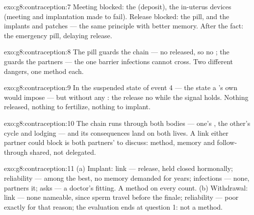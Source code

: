 \begin{solution}{exo:g8:contraception:7}
Meeting blocked: the  (deposit), the in-uterus
devices (meeting and implantation made to fail). Release
blocked: the pill, and the implants and patches --- the
same principle with better memory. After the fact: the
emergency pill, delaying release.
\end{solution}

\begin{solution}{exo:g8:contraception:8}
The pill guards the chain --- no  released, so no
; the  guards the partners --- the one
barrier infections cannot cross. Two different dangers,
one method each.
\end{solution}

\begin{solution}{exo:g8:contraception:9}
In the suspended state of event 4 --- the state a
's own  would impose --- but without any
: the  release no  while the
signal holds. Nothing released, nothing to fertilize,
nothing to implant.
\end{solution}

\begin{solution}{exo:g8:contraception:10}
The chain runs through both bodies --- one's , the
other's cycle and lodging --- and its consequences land on
both lives. A link either partner could block is both
partners' to discuss: method, memory and follow-through
shared, not delegated.
\end{solution}

\begin{solution}{exo:g8:contraception:11}
(a) Implant: link --- release, held closed hormonally;
reliability --- among the best, no memory demanded for
years; infections --- none,  partners it; asks --- a
doctor's fitting. A method on every count. (b)
Withdrawal: link --- none nameable, since sperm travel
before the finale; reliability --- poor exactly for that
reason; the evaluation ends at question 1: not a method.
\end{solution}

